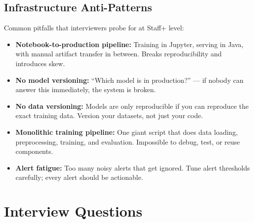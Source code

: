 \subsection{Infrastructure Anti-Patterns}

Common pitfalls that interviewers probe for at Staff+ level:

\begin{itemize}
    \item \textbf{Notebook-to-production pipeline:} Training in Jupyter, serving in Java, with manual artifact transfer in between. Breaks reproducibility and introduces skew.
    \item \textbf{No model versioning:} ``Which model is in production?'' --- if nobody can answer this immediately, the system is broken.
    \item \textbf{No data versioning:} Models are only reproducible if you can reproduce the exact training data. Version your datasets, not just your code.
    \item \textbf{Monolithic training pipeline:} One giant script that does data loading, preprocessing, training, and evaluation. Impossible to debug, test, or reuse components.
    \item \textbf{Alert fatigue:} Too many noisy alerts that get ignored. Tune alert thresholds carefully; every alert should be actionable.
\end{itemize}

\section{Interview Questions}
\label{sec:production_interview}

